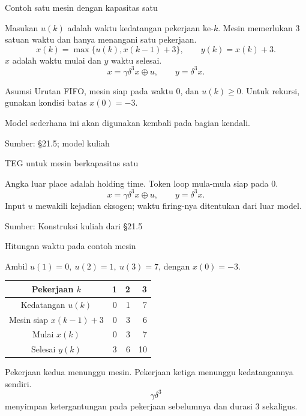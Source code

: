 \documentclass[aspectratio=169,11pt]{beamer}
\newcommand{\source}[1]{%
    \vfill
    \hfill{\tiny\color{gray}Sumber: #1}
}
\newcommand{\tok}[1]{\fill[AcademicBlue] (#1.center) circle (2.2pt);}
\begin{document}
\begin{frame}{Contoh satu mesin dengan kapasitas satu}


Masukan $u(k)$ adalah waktu kedatangan pekerjaan ke-$k$.
Mesin memerlukan $3$ satuan waktu dan hanya menangani satu pekerjaan.
\[
x(k)=\max\{u(k),x(k-1)+3\},\qquad y(k)=x(k)+3.
\]
$x$ adalah waktu mulai dan $y$ waktu selesai.
\[
x=\gamma\delta^3x\oplus u,\qquad y=\delta^3x.
\]
\begin{block}{Asumsi}
Urutan FIFO, mesin siap pada waktu $0$, dan $u(k)\ge0$.
Untuk rekursi, gunakan kondisi batas $x(0)=-3$.
\end{block}
Model sederhana ini akan digunakan kembali pada bagian kendali.

\source{\S21.5; model kuliah}

\end{frame}
\begin{frame}{TEG untuk mesin berkapasitas satu}

\begin{center}\end{center}
Angka luar place adalah holding time. Token loop mula-mula siap pada $0$.
\[
x=\gamma\delta^3x\oplus u,\qquad y=\delta^3x.
\]
Input $u$ mewakili kejadian eksogen; waktu firing-nya ditentukan dari luar model.

\source{Konstruksi kuliah dari \S21.5}
\end{frame}
\begin{frame}{Hitungan waktu pada contoh mesin}


Ambil $u(1)=0,\ u(2)=1,\ u(3)=7$, dengan $x(0)=-3$.
\begin{center}\begin{tabular}{c|rrr}\toprule
Pekerjaan $k$&1&2&3\\\midrule
Kedatangan $u(k)$&0&1&7\\
Mesin siap $x(k-1)+3$&0&3&6\\
Mulai $x(k)$&0&3&7\\
Selesai $y(k)$&3&6&10\\\bottomrule
\end{tabular}\end{center}
Pekerjaan kedua menunggu mesin. Pekerjaan ketiga menunggu kedatangannya sendiri.
\[
\gamma\delta^3
\]
menyimpan ketergantungan pada pekerjaan sebelumnya dan durasi $3$ sekaligus.


\end{frame}
\end{document}
